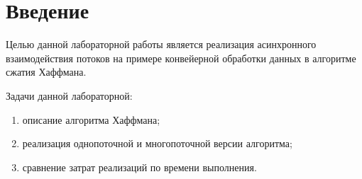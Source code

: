 \chapter*{Введение}

Целью данной лабораторной работы является реализация асинхронного взаимодействия потоков на примере конвейерной обработки данных в алгоритме сжатия Хаффмана.

Задачи данной лабораторной:
\begin{enumerate}
	\item описание алгоритма Хаффмана;
	\item реализация однопоточной и многопоточной версии алгоритма;
	\item сравнение затрат реализаций по времени выполнения.
\end{enumerate}
